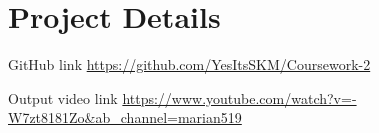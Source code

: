 \chapter{Project Details}

\vspace{1cm}

\begin{Large}

GitHub link \newline 
\url{https://github.com/YesItsSKM/Coursework-2}

\vspace{1cm}

Output video link \newline
\url{https://www.youtube.com/watch?v=-W7zt8181Zo&ab_channel=marian519 }

\end{Large}